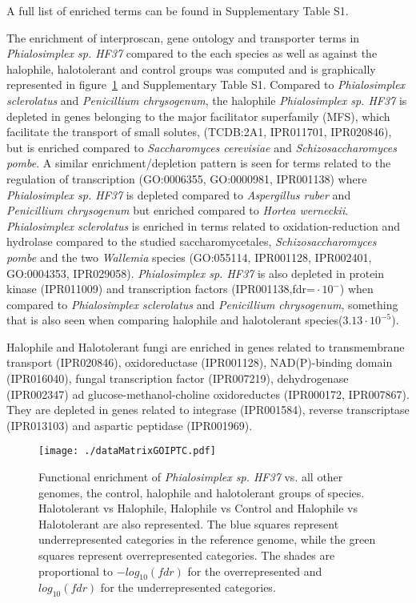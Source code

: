 \documentclass[fontsize=10pt, paper=a4,fleqn, ]{wlscirep}
\newcommand{\E}[2]{${#1}\cdot10^{-{#2}}$}
\newcommand{\horWer}{\textit{Hortea werneckii}}
\newcommand{\aspRub}{\textit{Aspergillus ruber}}
\newcommand{\penChr}{\textit{Penicillium chrysogenum}}
\newcommand{\sacCer}{\textit{Saccharomyces cerevisiae}}
\newcommand{\schPom}{\textit{Schizosaccharomyces pombe}}
\newcommand{\phiSp}{\textit{Phialosimplex sp. HF37}}
\newcommand{\phiScl}{\textit{Phialosimplex sclerolatus}}
\begin{document}
A full list of enriched terms can be found in Supplementary Table S1.


The enrichment of interproscan, gene ontology and transporter terms in
{\phiSp} compared to the each species as well as against the
halophile, halotolerant and control groups was computed and is
graphically represented in figure~\ref{fig:speciesEnrichment} and
Supplementary Table S1. Compared to {\phiScl} and {\penChr}, the
halophile {\phiSp} is depleted in genes belonging to the major
facilitator superfamily (MFS), which facilitate the transport of small
solutes, (TCDB:2A1, IPR011701, IPR020846), but is enriched compared to {\sacCer}
and {\schPom}. A similar enrichment/depletion pattern is seen for
terms related to the regulation of transcription (GO:0006355, GO:0000981,
IPR001138) where {\phiSp} is depleted compared to {\aspRub} and
{\penChr} but enriched compared to {\horWer}. {\phiScl} is enriched in
terms related to oxidation-reduction and hydrolase compared to the studied
saccharomycetales, {\schPom} and the two \textit{Wallemia} species
(GO:055114, IPR001128, IPR002401, GO:0004353, IPR029058).
{\phiSp} is also depleted in protein kinase (IPR011009) and
transcription factors (IPR001138,fdr=\E{}{}) when compared to
{\phiScl} and {\penChr}, something that is also seen when
comparing halophile and halotolerant species(\E{3.13}{5}).

Halophile and Halotolerant fungi are enriched in genes related to
transmembrane transport (IPR020846), oxidoreductase (IPR001128),
NAD(P)-binding domain (IPR016040), fungal transcription factor
(IPR007219), dehydrogenase (IPR002347) ad glucose-methanol-choline
oxidoreductes (IPR000172, IPR007867). They are depleted in genes
related to integrase (IPR001584), reverse transcriptase (IPR013103)
and aspartic peptidase (IPR001969).






\begin{figure}[!h]
  \centering
  \texttt{[image: ./dataMatrixGOIPTC.pdf]}
  \caption{\label{fig:speciesEnrichment} 
    Functional enrichment of {\phiSp} vs. all other genomes, the
    control, halophile and halotolerant groups of
    species. Halotolerant vs Halophile, Halophile vs Control and
    Halophile vs Halotolerant are also represented. The blue squares
    represent underrepresented categories in the reference genome,
    while the green squares represent overrepresented categories. The
    shades are proportional to $-log_{10}(fdr)$ for the overrepresented
    and $log_{10}(fdr)$ for the underrepresented categories.
  } 
\end{figure}
\end{document}
